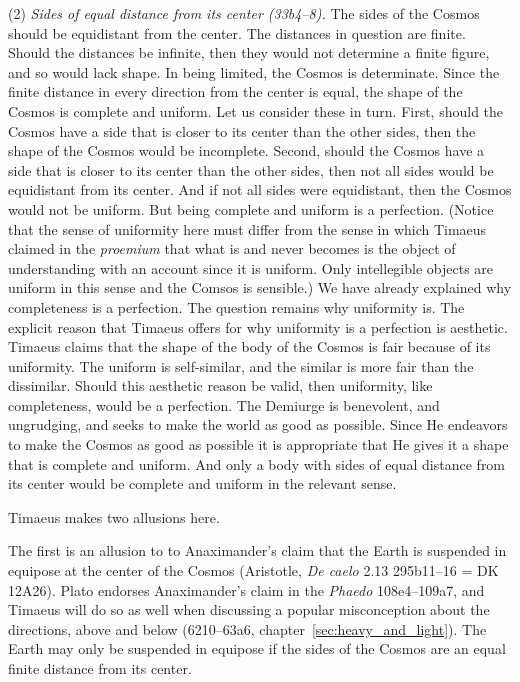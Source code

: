 (2) \emph{Sides of equal distance from its center (33b4--8).} The sides of the Cosmos should be equidistant from the center. The distances in question are finite. Should the distances be infinite, then they would not determine a finite figure, and so would lack shape. In being limited, the Cosmos is determinate. Since the finite distance in every direction from the center is equal, the shape of the Cosmos is complete and uniform. Let us consider these in turn. First, should the Cosmos have a side that is closer to its center than the other sides, then the shape of the Cosmos would be incomplete. Second, should the Cosmos have a side that is closer to its center than the other sides, then not all sides would be equidistant from its center. And if not all sides were equidistant, then the Cosmos would not be uniform. But being complete and uniform is a perfection. (Notice that the sense of uniformity here must differ from the sense in which Timaeus claimed in the \emph{proemium} that what is and never becomes is the object of understanding with an account since it is uniform. Only intellegible objects are uniform in this sense and the Comsos is sensible.) We have already explained why completeness is a perfection. The question remains why uniformity is. The explicit reason that Timaeus offers for why uniformity is a perfection is aesthetic. Timaeus claims that the shape of the body of the Cosmos is fair because of its uniformity. The uniform is self-similar, and the similar is more fair than the dissimilar. Should this aesthetic reason be valid, then uniformity, like completeness, would be a perfection. The Demiurge is benevolent, and ungrudging, and seeks to make the world as good as possible. Since He endeavors to make the Cosmos as good as possible it is appropriate that He gives it a shape that is complete and uniform. And only a body with sides of equal distance from its center would be complete and uniform in the relevant sense.

Timaeus makes two allusions here. 

The first is an allusion to to Anaximander's claim that the Earth is suspended in equipose at the center of the Cosmos (Aristotle, \emph{De caelo} 2.13 295b11–16 = DK 12A26). Plato endorses Anaximander’s claim in the \emph{Phaedo} 108e4–109a7, and Timaeus will do so as well when discussing a popular misconception about the directions, above and below (6210–63a6, chapter~\ref{sec:heavy_and_light}). The Earth may only be suspended in equipose if the sides of the Cosmos are an equal finite distance from its center. 

